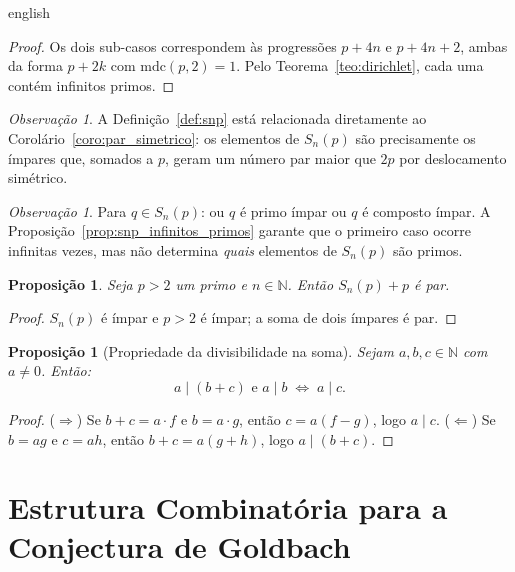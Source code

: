 \documentclass[a4paper,11pt]{article}
\newtheorem{proposition}[theorem]{Proposição}
\theoremstyle{definition}
\theoremstyle{remark}
\newtheorem{remark}[theorem]{Observação}
\begin{document}
\begin{otherlanguage*}{english}
		\begin{proof}
			Os dois sub-casos correspondem às progressões $p + 4n$ e $p + 4n + 2$,
			ambas da forma $p + 2k$ com $\mathrm{mdc}(p, 2) = 1$. Pelo
			Teorema~\ref{teo:dirichlet}, cada uma contém infinitos primos.
		\end{proof}
		
		\begin{remark}
			A Definição~\ref{def:snp} está relacionada diretamente ao
			Corolário~\ref{coro:par_simetrico}: os elementos de $S_n(p)$ são
			precisamente os ímpares que, somados a $p$, geram um número par maior
			que $2p$ por deslocamento simétrico.
		\end{remark}
		
		\begin{remark}
			Para $q \in S_n(p)$: ou $q$ é primo ímpar ou $q$ é composto ímpar. A
			Proposição~\ref{prop:snp_infinitos_primos} garante que o primeiro caso
			ocorre infinitas vezes, mas não determina \emph{quais} elementos de
			$S_n(p)$ são primos.
		\end{remark}
		
		\begin{proposition}
			Seja $p > 2$ um primo e $n \in \mathbb{N}$. Então $S_n(p) + p$ é par.
		\end{proposition}
		
		\begin{proof}
			$S_n(p)$ é ímpar e $p > 2$ é ímpar; a soma de dois ímpares é par.
		\end{proof}
		
		\begin{proposition}[Propriedade da divisibilidade na soma]%
			\label{prop:divisibilidade_na_soma}
			Sejam $a, b, c \in \mathbb{N}$ com $a \neq 0$. Então:
			\[
			a \mid (b + c) \text{ e } a \mid b \;\Longleftrightarrow\; a \mid c.
			\]
		\end{proposition}
		
		\begin{proof}
			($\Rightarrow$) Se $b + c = a \cdot f$ e $b = a \cdot g$, então
			$c = a(f-g)$, logo $a \mid c$.
			($\Leftarrow$) Se $b = ag$ e $c = ah$, então $b + c = a(g+h)$, logo
			$a \mid (b+c)$.
		\end{proof}
		
		\section{Estrutura Combinatória para a Conjectura de Goldbach}
		

\end{otherlanguage*}
\end{document}

